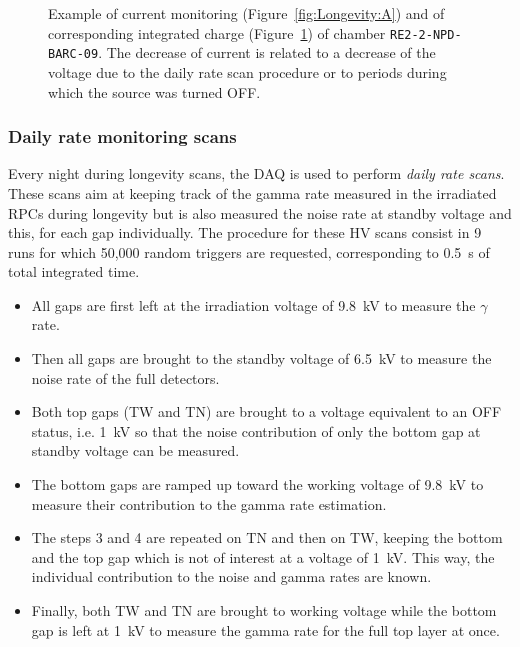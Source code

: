 \begin{figure}[H]
\begin{subfigure}{0.5\linewidth}
        	\caption{\label{fig:Longevity:B}}
    	\end{subfigure}
		\caption{\label{fig:Longevity} Example of current monitoring (Figure~\ref{fig:Longevity:A}) and of corresponding integrated charge (Figure~\ref{fig:Longevity:B}) of chamber \texttt{RE2-2-NPD-BARC-09}. The decrease of current is related to a decrease of the voltage due to the daily rate scan procedure or to periods during which the source was turned OFF.}
	\end{figure}
	
		\subsubsection{Daily rate monitoring scans}
		\label{chapt5:sssec:dailyratescan}
	
	Every night during longevity scans, the DAQ is used to perform \textit{daily rate scans}. These scans aim at keeping track of the gamma rate measured in the irradiated RPCs during longevity but is also measured the noise rate at standby voltage and this, for each gap individually. The procedure for these HV scans consist in 9 runs for which 50,000 random triggers are requested, corresponding to \SI{0.5}{s} of total integrated time.
	
	\begin{itemize}
		\item[1-] All gaps are first left at the irradiation voltage of \SI{9.8}{kV} to measure the $\gamma$ rate.
		\item[2-] Then all gaps are brought to the standby voltage of \SI{6.5}{kV} to measure the noise rate of the full detectors.
		\item[3-] Both top gaps (TW and TN) are brought to a voltage equivalent to an OFF status, i.e. \SI{1}{kV} so that the noise contribution of only the bottom gap at standby voltage can be measured.
		\item[4-] The bottom gaps are ramped up toward the working voltage of \SI{9.8}{kV} to measure their contribution to the gamma rate estimation.
		\item[5-8] The steps 3 and 4 are repeated on TN and then on TW, keeping the bottom and the top gap which is not of interest at a voltage of \SI{1}{kV}. This way, the individual contribution to the noise and gamma rates are known.
		\item[9-] Finally, both TW and TN are brought to working voltage while the bottom gap is left at \SI{1}{kV} to measure the gamma rate for the full top layer at once.
	\end{itemize}
	
